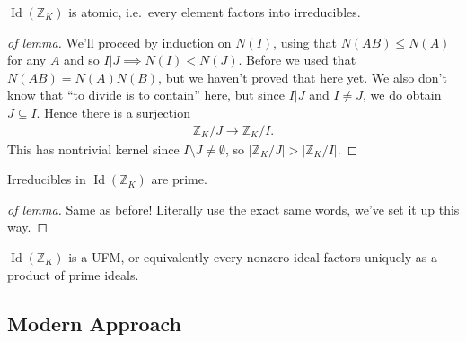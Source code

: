 \begin{lemma}

\(\operatorname{Id}({\mathbb{Z}}_K)\) is atomic, i.e.~every element
factors into irreducibles.

\end{lemma}

\begin{proof}[of lemma]

We'll proceed by induction on \(N(I)\), using that \(N(AB) \leq N(A)\)
for any \(A\) and so \(I\mathrel{\Big|}J \implies N(I) < N(J)\). Before
we used that \(N(AB) = N(A) N(B)\), but we haven't proved that here yet.
We also don't know that ``to divide is to contain'' here, but since
\(I\mathrel{\Big|}J\) and \(I\neq J\), we do obtain \(J \subsetneq I\).
Hence there is a surjection
\begin{align*}
{\mathbb{Z}}_K/J \to {\mathbb{Z}}_K/I
.\end{align*}
This has nontrivial kernel since \(I\setminus J \neq \emptyset\), so
\({\left\lvert {{\mathbb{Z}}_K/J} \right\rvert}> {\left\lvert {{\mathbb{Z}}_K/I} \right\rvert}\).

\end{proof}

\begin{lemma}

Irreducibles in \(\operatorname{Id}({\mathbb{Z}}_K)\) are prime.

\end{lemma}

\begin{proof}[of lemma]

Same as before! Literally use the exact same words, we've set it up this
way.

\end{proof}

\begin{theorem}

\(\operatorname{Id}({\mathbb{Z}}_K)\) is a UFM, or equivalently every
nonzero ideal factors uniquely as a product of prime ideals.

\end{theorem}

\hypertarget{modern-approach}{%
\subsection{Modern Approach}\label{modern-approach}}

